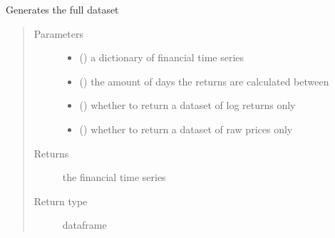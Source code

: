 \documentclass[letterpaper,10pt,english]{sphinxmanual}
\begin{document}
\begin{fulllineitems}
\label{\detokenize{index:Src.preprocessing.generate_dataset}}
Generates the full dataset
\begin{quote}\begin{description}
\item[{Parameters}] \leavevmode\begin{itemize}
\item {} 
 () \textendash{} a dictionary of financial time series

\item {} 
 () \textendash{} the amount of days the returns are calculated between

\item {} 
 () \textendash{} whether to return a dataset of log returns only

\item {} 
 () \textendash{} whether to return a dataset of raw prices only

\end{itemize}

\item[{Returns}] \leavevmode
the financial time series

\item[{Return type}] \leavevmode
dataframe

\end{description}\end{quote}

\end{fulllineitems}

\end{document}

